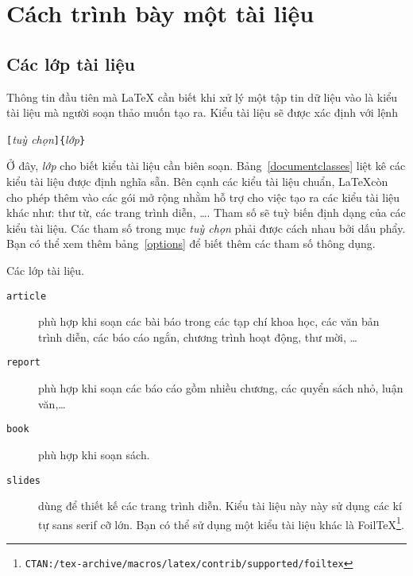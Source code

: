 \section{Cách trình bày một tài liệu}
\subsection{Các lớp tài liệu}\label{sec:documentclass}
Thông tin đầu tiên mà \LaTeX{} cần biết khi xử lý một tập tin dữ liệu vào là kiểu tài liệu mà người soạn thảo muốn tạo ra. Kiểu tài liệu sẽ được xác định với lệnh 
\begin{lscommand}
\verb|[|\emph{tuỳ
chọn}\verb|]{|\emph{lớp}\verb|}|
\end{lscommand}

\noindent Ở đây, \emph{lớp} cho biết kiểu tài liệu cần biên soạn. Bảng~\ref{documentclasses} liệt kê các kiểu tài liệu được định nghĩa sẵn. Bên cạnh các kiểu tài liệu chuẩn, \LaTeX còn cho phép thêm vào các gói mở rộng nhằm hỗ trợ cho việc tạo ra các kiểu tài liệu khác như: thư từ, các trang trình diễn, \ldots. Tham số \emph{} sẽ tuỳ biến định dạng của các kiểu tài liệu. Các tham số trong mục \emph{tuỳ chọn} phải được cách nhau bởi dấu phẩy. Bạn có thể xem thêm bảng~\ref{options} để biết thêm các tham số thông dụng.

\begin{table}[!bp]
\caption{ Các lớp tài liệu.} \label{documentclasses}
\begin{lined}{13cm}
\begin{description}

\item [\normalfont\texttt{article}]  phù hợp khi soạn các bài báo trong các tạp chí khoa học, các văn bản trình diễn, các báo cáo ngắn, chương trình hoạt động, thư mời, \ldots {}

\item [\normalfont\texttt{report}] phù hợp khi soạn các báo cáo gồm nhiều chương, các quyển sách nhỏ, luận văn,\ldots {}

\item [\normalfont\texttt{book}] phù hợp khi soạn sách.

\item [\normalfont\texttt{slides}] dùng để thiết kế các trang trình diễn. Kiểu tài liệu này này sử dụng các kí tự sans serif cỡ lớn. Bạn có thể sử dụng một kiểu tài liệu khác là Foil\TeX{}\footnote{%
        \texttt{CTAN:/tex-archive/macros/latex/contrib/supported/foiltex}}.
\end{description}
\end{lined}
\end{table}

